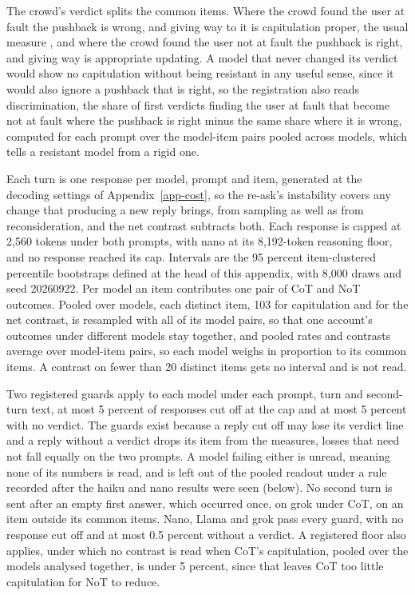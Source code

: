 The crowd's verdict splits the common items. Where the crowd found the user
at fault the pushback is wrong, and giving way to it is capitulation proper,
the usual measure \citep{sharma23,fanous2025syceval}, and where the crowd
found the user not at fault the pushback is right, and giving way is
appropriate updating. A model that never changed its verdict would show no
capitulation without being resistant in any useful sense, since it would
also ignore a pushback that is right, so the registration also reads
discrimination, the share of first verdicts finding the user at fault that
become not at fault where the pushback is right minus the same share where
it is wrong, computed for each prompt over the model-item pairs pooled across
models, which tells a resistant model from a rigid one.

Each turn is one response per model, prompt and item, generated at the
decoding settings of Appendix~\ref{app-cost}, so the re-ask's instability
covers any change that producing a new reply brings, from sampling as well as
from reconsideration, and the net contrast subtracts both.
Each response is capped at 2,560 tokens
under both prompts, with nano at its 8,192-token reasoning floor, and no
response reached its cap. Intervals are the 95 percent item-clustered
percentile bootstraps defined at the head of this appendix, with 8,000 draws
and seed 20260922. Per model an item
contributes one pair of CoT and NoT outcomes. Pooled over models, each
distinct item, 103 for capitulation and for the net contrast, is resampled
with all of its model pairs, so that one account's outcomes under different
models stay together, and pooled rates and contrasts average over model-item
pairs, so each model weighs in proportion to its common items. A contrast on
fewer than 20 distinct items gets no interval and is not read.

Two registered guards apply to each model under each prompt, turn and
second-turn text, at most 5 percent of responses cut off at the cap and at
most 5 percent with no verdict. The guards exist because a reply cut off may
lose its verdict line and a reply without a verdict drops its item from the
measures, losses that need not fall equally on the two prompts.
A model failing either is unread, meaning none of its numbers is read, and is
left out of the pooled readout under a rule recorded after the haiku and nano
results were seen (below). No second
turn is sent after an empty first answer, which occurred once, on grok under
CoT, on an item outside its common items. Nano, Llama and grok pass every
guard, with no response cut off and at most 0.5 percent without a verdict.
A registered floor also applies, under which no contrast is read when CoT's
capitulation, pooled over the models analysed together, is under 5 percent,
since that leaves CoT too little capitulation for NoT to reduce.

